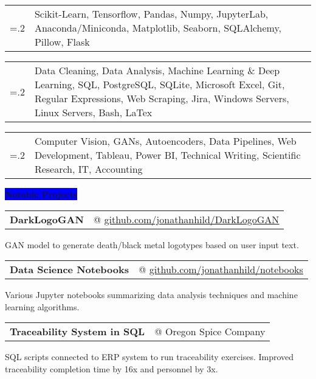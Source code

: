 \documentclass[letterpaper,12pt]{article}[leftmargin=*]
\makeatletter
\newcommand{\projects}[2]{\vspace{4pt}
  \colorbox{Blue}{\color{white}#1\hspace{9pt}\raggedbottom\normalsize\textbf{#2\hspace{4pt}}}
}
\newcommand{\resumeSectionStart}{\begin{itemize}[leftmargin=0.1in]}
\newcommand{\resumeSectionEnd}{\end{itemize}}
\newcommand{\repo}[2]{\href{#1}{\underline{#2}}}
\newcommand{\resumeProject}[3]{
  \item[]
    \begin{tabularx}{0.97\textwidth}{X@{\hspace{60pt}} r}
      \textbf{\color{primary}#1} & {\color{accent}\small#2} \\
    \end{tabularx}
    {#3}
    \vspace{-6pt}
}
\newcommand{\resumeSkill}[2]{
  \item[]
    \begin{tabularx}{0.97\textwidth}{>{\hsize=.2\hsize}X X }
      {\textbf{#1}} & {\small#2} \\
    \end{tabularx}  
    \vspace{-6pt}

}
\newcommand{\tag}[1]{%
  \tikzmarknode[fill=white,fill opacity=0,draw=subtle!60!subtle,thick,rounded corners,inner sep=0.4ex,text height=1.5ex,text depth=.25ex, text opacity=1]{test}{\hspace{1pt}\small{#1}\hspace{1pt}}
}
\makeatother
\begin{document}
\resumeSectionStart{
  \resumeSkill{Python ++++}{Scikit-Learn, Tensorflow, Pandas, Numpy, JupyterLab, Anaconda/Miniconda, Matplotlib, Seaborn, SQLAlchemy, Pillow, Flask}
  \resumeSkill{Proficient ++}{Data Cleaning, Data Analysis, Machine Learning \& Deep Learning, SQL, PostgreSQL, SQLite, Microsoft Excel, Git, Regular Expressions, Web Scraping, Jira, Windows Servers, Linux Servers, Bash, LaTex}
  \resumeSkill{Familiar +}{Computer Vision, GANs, Autoencoders, Data Pipelines, Web Development, Tableau, Power BI, Technical Writing, Scientific Research, IT, Accounting}
}
\resumeSectionEnd{}

\projects{\faFlask}{Notable Projects}

\resumeSectionStart{
  \resumeProject{DarkLogoGAN}{@ \repo{https://github.com/jonathanhild/DarkLogoGAN}{github.com/jonathanhild/DarkLogoGAN}}{\tag{In Process}GAN model to generate death/black metal logotypes based on user input text.}
  \resumeProject{Data Science Notebooks}{@ \repo{https://github.com/jonathanhild/notebooks}{github.com/jonathanhild/notebooks}}{Various Jupyter notebooks summarizing data analysis techniques and machine learning algorithms.}
  \resumeProject{Traceability System in SQL}{@ Oregon Spice Company}{SQL scripts connected to ERP system to run traceability exercises. Improved traceability completion time by 16x and personnel by 3x.}
}
\resumeSectionEnd{}

\end{document}
